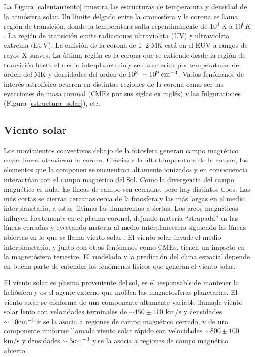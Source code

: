 \documentclass[a4paper,11pt]{report}
\def\fig#1{Figura \ref{#1}}
\begin{document}
La Figura \ref{calentamiento} muestra las estructuras de temperatura y densidad de la atmósfera solar. Un límite delgado entre la cromosfera y la corona es llama región de transición, donde la temperatura salta repentinamente de $10^4$ K a $10^6 K$. La región de transición emite radiaciones ultravioleta (UV) y ultravioleta extrema (EUV). La emisión de la corona de 1–2 MK está en el EUV a rangos de rayos X suaves.
La última región es la corona que se extiende desde la región de transición hasta el medio interplanetario y se caracteriza por temperaturas del orden del MK y densidades del orden de $10^8\ - 10^9\ \rm {cm^{-3}}$. Varios fenómenos de interés astrofísico ocurren en distintas regiones de la corona como ser las eyecciones de masa coronal (CMEs por sus siglas en inglés) y las fulguraciones (\fig{estructura_solar}), etc.

\subsection{Viento solar}
Los movimientos convectivos debajo de la fotosfera generan campo magnético cuyas líneas atraviesan la corona. Gracias a la alta temperatura de la corona, los elementos que la componen se encuentran altamente ionizados y en consecuencia interactúan con el campo magnético del Sol. Como la divergencia del campo magnético es nula, las líneas de campo son cerradas, pero hay distintos tipos. Las más cortas se cierran cercanas cerca de la fotosfera y las más largas en el medio interplanetario, a estas últimas las llamaremos abiertas. Los arcos magnéticos influyen fuertemente en el plasma coronal, dejando materia ``atrapada'' en las líneas cerradas y eyectando materia al medio interplanetario siguiendo las líneas abiertas en lo que se llama {viento solar} . El viento solar invade el medio interplanetario, y junto con otros fenómenos como CMEs, tienen un impacto en la magnetósfera terrestre. El modelado y la predicción del clima espacial depende en buena parte de entender los fenómenos físicos que generan el viento solar.

El viento solar es plasma proveniente del sol, es el responsable de mantener la heliósfera y es el agente externo que moldea las magnetosferas planetarias. El viento solar se conforma de una componente altamente variable llamada viento solar lento con velocidades terminales de $\sim 450\pm 100$ km/s y densidades $\sim 10 \rm{ cm^{-3}}$ y se la asocia a regiones de campo magnético cerrado, y de una componente uniforme llamada viento solar rápido con velocidades $\sim 800\pm 100$ km/s y densidades $\sim 3 \rm{ cm^{-3}}$ y se la asocia a regiones de campo magnético abierto.
\end{document}
